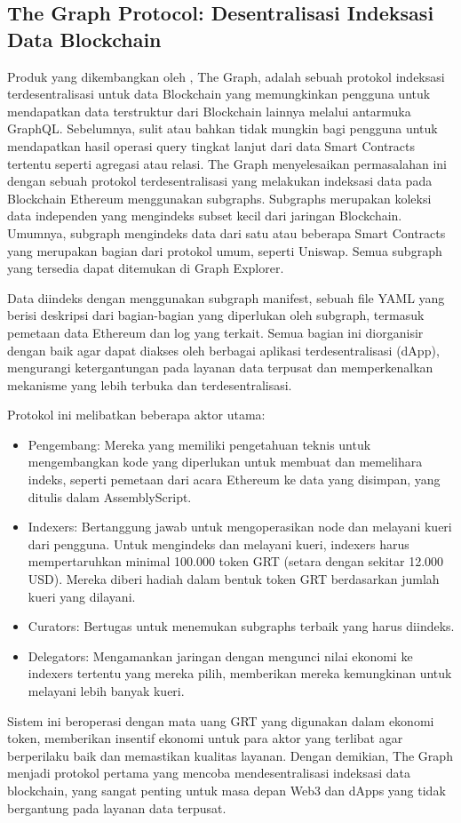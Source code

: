 \subsection{The Graph Protocol: Desentralisasi Indeksasi Data Blockchain}
\label{subsec:the-graph-protocol}

Produk yang dikembangkan oleh \cite{TheGraphDocs}, The Graph, adalah sebuah protokol indeksasi terdesentralisasi untuk data Blockchain yang memungkinkan pengguna untuk mendapatkan data terstruktur dari Blockchain lainnya melalui antarmuka GraphQL. Sebelumnya, sulit atau bahkan tidak mungkin bagi pengguna untuk mendapatkan hasil operasi query tingkat lanjut dari data Smart Contracts tertentu seperti agregasi atau relasi. The Graph menyelesaikan permasalahan ini dengan sebuah protokol terdesentralisasi yang melakukan indeksasi data pada Blockchain Ethereum menggunakan subgraphs. Subgraphs merupakan koleksi data independen yang mengindeks subset kecil dari jaringan Blockchain. Umumnya, subgraph mengindeks data dari satu atau beberapa Smart Contracts yang merupakan bagian dari protokol umum, seperti Uniswap. Semua subgraph yang tersedia dapat ditemukan di Graph Explorer.

Data diindeks dengan menggunakan subgraph manifest, sebuah file YAML yang berisi deskripsi dari bagian-bagian yang diperlukan oleh subgraph, termasuk pemetaan data Ethereum dan log yang terkait. Semua bagian ini diorganisir dengan baik agar dapat diakses oleh berbagai aplikasi terdesentralisasi (dApp), mengurangi ketergantungan pada layanan data terpusat dan memperkenalkan mekanisme yang lebih terbuka dan terdesentralisasi.

Protokol ini melibatkan beberapa aktor utama:

\begin{itemize}
	\item Pengembang: Mereka yang memiliki pengetahuan teknis untuk mengembangkan kode yang diperlukan untuk membuat dan memelihara indeks, seperti pemetaan dari acara Ethereum ke data yang disimpan, yang ditulis dalam AssemblyScript.
	\item Indexers: Bertanggung jawab untuk mengoperasikan node dan melayani kueri dari pengguna. Untuk mengindeks dan melayani kueri, indexers harus mempertaruhkan minimal 100.000 token GRT (setara dengan sekitar 12.000 USD). Mereka diberi hadiah dalam bentuk token GRT berdasarkan jumlah kueri yang dilayani.
	\item Curators: Bertugas untuk menemukan subgraphs terbaik yang harus diindeks.
	\item Delegators: Mengamankan jaringan dengan mengunci nilai ekonomi ke indexers tertentu yang mereka pilih, memberikan mereka kemungkinan untuk melayani lebih banyak kueri.
\end{itemize}

Sistem ini beroperasi dengan mata uang GRT yang digunakan dalam ekonomi token, memberikan insentif ekonomi untuk para aktor yang terlibat agar berperilaku baik dan memastikan kualitas layanan. Dengan demikian, The Graph menjadi protokol pertama yang mencoba mendesentralisasi indeksasi data blockchain, yang sangat penting untuk masa depan Web3 dan dApps yang tidak bergantung pada layanan data terpusat.